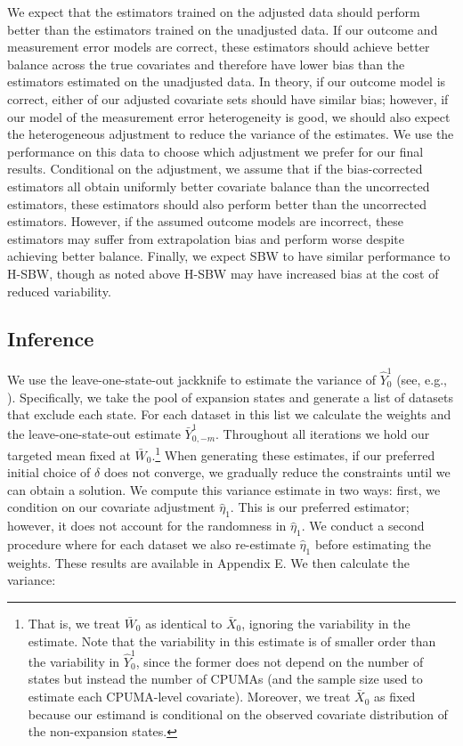 \documentclass[aoas]{imsart}
\theoremstyle{plain}
\theoremstyle{remark}
\begin{document}
We expect that the estimators trained on the adjusted data should perform better than the estimators trained on the unadjusted data. If our outcome and measurement error models are correct, these estimators should achieve better balance across the true covariates and therefore have lower bias than the estimators estimated on the unadjusted data. In theory, if our outcome model is correct, either of our adjusted covariate sets should have similar bias; however, if our model of the measurement error heterogeneity is good, we should also expect the heterogeneous adjustment to reduce the variance of the estimates. We use the performance on this data to choose which adjustment we prefer for our final results. Conditional on the adjustment, we assume that if the bias-corrected estimators all obtain uniformly better covariate balance than the uncorrected estimators, these estimators should also perform better than the uncorrected estimators. However, if the assumed outcome models are incorrect, these estimators may suffer from extrapolation bias and perform worse despite achieving better balance. Finally, we expect SBW to have similar performance to H-SBW, though as noted above H-SBW may have increased bias at the cost of reduced variability. 

\subsection{Inference}

We use the leave-one-state-out jackknife to estimate the variance of $\hat{Y}_0^1$ (see, e.g., \cite{cameron2015practitioner}). Specifically, we take the pool of expansion states and generate a list of datasets that exclude each state. For each dataset in this list we calculate the weights and the leave-one-state-out estimate $\bar{Y}^1_{0, -m}$. Throughout all iterations we hold our targeted mean fixed at $\bar{W}_0$.\footnote{That is, we treat $\bar{W}_0$ as identical to $\bar{X}_0$, ignoring the variability in the estimate. Note that the variability in this estimate is of smaller order than the variability in $\hat{Y}_0^1$, since the former does not depend on the number of states but instead the number of CPUMAs (and the sample size used to estimate each CPUMA-level covariate). Moreover, we treat $\bar{X}_0$ as fixed because our estimand is conditional on the observed covariate distribution of the non-expansion states.} When generating these estimates, if our preferred initial choice of $\delta$ does not converge, we gradually reduce the constraints until we can obtain a solution. We compute this variance estimate in two ways: first, we condition on our covariate adjustment $\hat{\eta}_1$. This is our preferred estimator; however, it does not account for the randomness in $\hat{\eta}_1$. We conduct a second procedure where for each dataset we also re-estimate $\hat{\eta}_1$ before estimating the weights. These results are available in Appendix E. We then calculate the variance:
\end{document}
